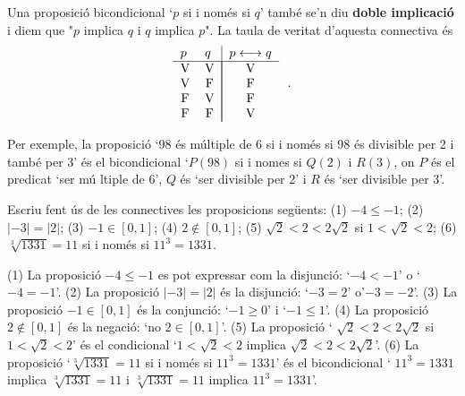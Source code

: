 Una proposici\'{o} bicondicional `$p$ si i nom\'{e}s si $q$' tamb\'{e} se'n
diu \textbf{doble implicaci\'{o}} i diem que "$p$ implica $q$ i $q$ implica $%
p$". La taula de veritat d'aquesta connectiva \'{e}s%
\begin{equation*}
\begin{tabular}{ll|l}
$p$ & $q$ & $p\longleftrightarrow q$ \\ \hline
\multicolumn{1}{c}{V} & \multicolumn{1}{c|}{V} & \multicolumn{1}{|c}{V} \\
\multicolumn{1}{c}{V} & \multicolumn{1}{c|}{F} & \multicolumn{1}{|c}{F} \\
\multicolumn{1}{c}{F} & \multicolumn{1}{c|}{V} & \multicolumn{1}{|c}{F} \\
\multicolumn{1}{c}{F} & \multicolumn{1}{c|}{F} & \multicolumn{1}{|c}{V}%
\end{tabular}
\text{.}
\end{equation*}

Per exemple, la proposici\'{o} `98 \'{e}s m\'{u}ltiple de 6 si i nom\'{e}s
si 98 \'{e}s divisible per 2 i tamb\'{e} per 3' \'{e}s el bicondicional `$%
P(98)$ si i nomes si $Q(2)$ i $R(3)$, on $P$ \'{e}s el predicat `ser m\'{u}%
ltiple de 6', $Q$ \'{e}s `ser divisible per 2' i $R$ \'{e}s `ser divisible
per 3'.

\begin{exemple}
Escriu fent \'{u}s de les connectives les proposicions seg\"{u}ents: (1) $%
-4\leq-1$; (2) $\left\vert -3\right\vert =\left\vert 2\right\vert $; (3) $%
-1\in\left[ 0,1\right] $; (4) $2\notin\left[ 0,1\right] $; (5) $\sqrt {2}<2<2%
\sqrt{2}$ si $1<\sqrt{2}<2$; (6) $\sqrt[3]{1331}=11$ si i nom\'{e}s si $%
11^{3}=1331$.
\end{exemple}

\begin{solucio}
(1) La proposici\'{o} $-4\leq-1$ es pot expressar com la disjunci\'{o}: `$%
-4<-1$' o `$-4=-1$'. (2) La proposici\'{o} $\left\vert -3\right\vert
=\left\vert 2\right\vert $ \'{e}s la disjunci\'{o}: `$-3=2$' o'$-3=-2$'. (3)
La proposici\'{o} $-1\in\left[ 0,1\right] $ \'{e}s la conjunci\'{o}: `$%
-1\geq0$' i `$-1\leq1$'. (4) La proposici\'{o} $2\notin\left[ 0,1\right] $
\'{e}s la negaci\'{o}: `no $2\in\left[ 0,1\right] $'. (5) La proposici\'{o} `%
$\sqrt{2}<2<2\sqrt{2}$ si $1<\sqrt{2}<2$' \'{e}s el condicional `$1<\sqrt {2}%
<2$ implica $\sqrt{2}<2<2\sqrt{2}$'. (6) La proposici\'{o} `$\sqrt[3]{1331}%
=11$ si i nom\'{e}s si $11^{3}=1331$' \'{e}s el bicondicional ` $11^{3}=1331$
implica $\sqrt[3]{1331}=11$ i $\sqrt[3]{1331}=11$ implica $11^{3}=1331$'.
\end{solucio}


